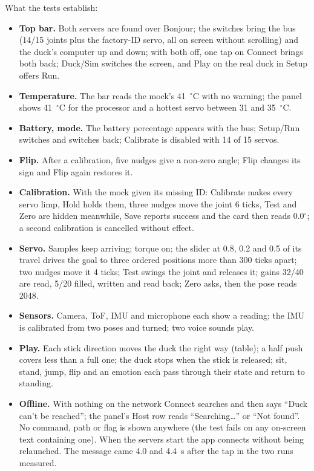 \documentclass[11pt]{article}
\begin{document}
What the tests establish:
\begin{itemize}\itemsep0pt
\item \textbf{Top bar.} Both servers are found over Bonjour; the switches bring the bus (14/15 joints plus the
factory-ID servo, all on screen without scrolling) and the duck's computer up and down; with both off, one tap on
Connect brings both back; Duck/Sim switches the screen, and Play on the real duck in Setup offers Run.
\item \textbf{Temperature.} The bar reads the mock's 41~$^\circ$C with no warning; the panel shows 41~$^\circ$C for the
processor and a hottest servo between 31 and 35~$^\circ$C.
\item \textbf{Battery, mode.} The battery percentage appears with the bus; Setup/Run switches and switches back;
Calibrate is disabled with 14 of 15 servos.
\item \textbf{Flip.} After a calibration, five nudges give a non-zero angle; Flip changes its sign and Flip again restores it.
\item \textbf{Calibration.} With the mock given its missing ID: Calibrate makes every servo limp, Hold holds them,
three nudges move the joint 6 ticks, Test and Zero are hidden meanwhile, Save reports success and the card then
reads 0.0$^\circ$; a second calibration is cancelled without effect.
\item \textbf{Servo.} Samples keep arriving; torque on; the slider at 0.8, 0.2 and 0.5 of its travel drives the
goal to three ordered positions more than 300 ticks apart; two nudges move it 4 ticks; Test swings the joint and releases it; gains 32/40 are read, 5/20 filled, written and
read back; Zero asks, then the pose reads 2048.
\item \textbf{Sensors.} Camera, ToF, IMU and microphone each show a reading; the IMU is calibrated from two poses and turned; two voice sounds play.
\item \textbf{Play.} Each stick direction moves the duck the right way (table); a half push covers less than a
full one; the duck stops when the stick is released; sit, stand, jump, flip and an emotion each pass through
their state and return to standing.
\item \textbf{Offline.} With nothing on the network Connect searches and then says ``Duck can't be reached''; the
panel's Host row reads ``Searching\ldots'' or ``Not found''. No command, path or flag is shown anywhere (the test
fails on any on-screen text containing one). When the servers start the app connects without being relaunched. The message came 4.0 and 4.4~s after the tap in the two runs measured.
\end{itemize}
\end{document}
